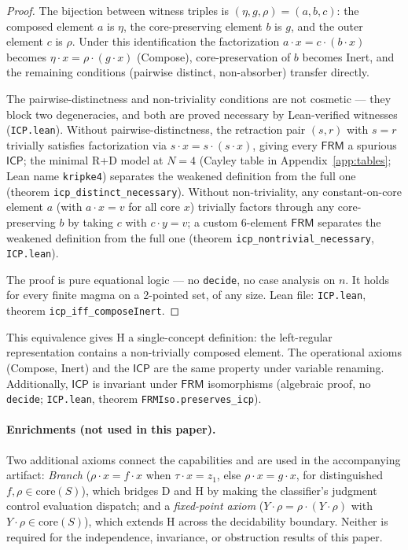 \documentclass[sigconf,screen]{acmart}
\newcommand{\dotop}{\cdot}
\newcommand{\FRM}{\textsf{FRM}}
\newcommand{\ICP}{\textsf{ICP}}
\newcommand{\core}{\mathrm{core}}
\theoremstyle{remark}
\begin{document}
\begin{proof}
The bijection between witness triples is $(\eta, g, \rho) = (a, b, c)$: the composed element $a$ is $\eta$, the core-preserving element $b$ is $g$, and the outer element $c$ is $\rho$. Under this identification the factorization $a \dotop x = c \dotop (b \dotop x)$ becomes $\eta \dotop x = \rho \dotop (g \dotop x)$ (Compose), core-preservation of $b$ becomes Inert, and the remaining conditions (pairwise distinct, non-absorber) transfer directly.

The pairwise-distinctness and non-triviality conditions are not cosmetic --- they block two degeneracies, and both are proved necessary by Lean-verified witnesses (\texttt{ICP.lean}). Without pairwise-distinctness, the retraction pair $(s, r)$ with $s = r$ trivially satisfies factorization via $s \dotop x = s \dotop (s \dotop x)$, giving every $\FRM$ a spurious $\ICP$; the minimal R{+}D model at $N\!=\!4$ (Cayley table in Appendix~\ref{app:tables}; Lean name \texttt{kripke4}) separates the weakened definition from the full one (theorem \texttt{icp\_distinct\_necessary}). Without non-triviality, any constant-on-core element $a$ (with $a \dotop x = v$ for all core $x$) trivially factors through any core-preserving $b$ by taking $c$ with $c \dotop y = v$; a custom 6-element $\FRM$ separates the weakened definition from the full one (theorem \texttt{icp\_nontrivial\_necessary}, \texttt{ICP.lean}).

The proof is pure equational logic --- no \texttt{decide}, no case analysis on $n$. It holds for every finite magma on a 2-pointed set, of any size. Lean file: \texttt{ICP.lean}, theorem \texttt{icp\_iff\_composeInert}.
\end{proof}

This equivalence gives H a single-concept definition: the left-regular representation contains a non-trivially composed element. The operational axioms (Compose, Inert) and the $\ICP$ are the same property under variable renaming. Additionally, $\ICP$ is invariant under $\FRM$ isomorphisms (algebraic proof, no \texttt{decide}; \texttt{ICP.lean}, theorem \texttt{FRMIso.preserves\_icp}).

\paragraph{Enrichments (not used in this paper).}
Two additional axioms connect the capabilities and are used in the accompanying artifact: \emph{Branch} ($\rho \dotop x = f \dotop x$ when $\tau \dotop x = z_1$, else $\rho \dotop x = g \dotop x$, for distinguished $f, \rho \in \core(S)$), which bridges D and H by making the classifier's judgment control evaluation dispatch; and a \emph{fixed-point axiom} ($Y \dotop \rho = \rho \dotop (Y \dotop \rho)$ with $Y \dotop \rho \in \core(S)$), which extends H across the decidability boundary. Neither is required for the independence, invariance, or obstruction results of this paper.
\end{document}
